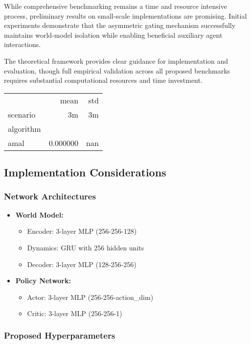 \documentclass[12pt, a4paper]{article}
\begin{document}
While comprehensive benchmarking remains a time and resource intensive process, preliminary results on small-scale implementations are promising. Initial experiments demonstrate that the asymmetric gating mechanism successfully maintains world-model isolation while enabling beneficial auxiliary agent interactions.

The theoretical framework provides clear guidance for implementation and evaluation, though full empirical validation across all proposed benchmarks requires substantial computational resources and time investment.
\begin{tabular}{lrr}
	& mean & std \\
	scenario & 3m & 3m \\
	algorithm &  &  \\
	amal & 0.000000 & nan \\
\end{tabular}

\subsection{Implementation Considerations}

\subsubsection{Network Architectures}

\begin{itemize}

\item \textbf{World Model:}
\begin{itemize}
\item Encoder: 3-layer MLP (256-256-128)
\item Dynamics: GRU with 256 hidden units
\item Decoder: 3-layer MLP (128-256-256)
\end{itemize}

\item \textbf{Policy Network:}
\begin{itemize}
\item Actor: 3-layer MLP (256-256-action\_dim)
\item Critic: 3-layer MLP (256-256-1)
\end{itemize}

\end{itemize}

\subsubsection{Proposed Hyperparameters}
\end{document}
